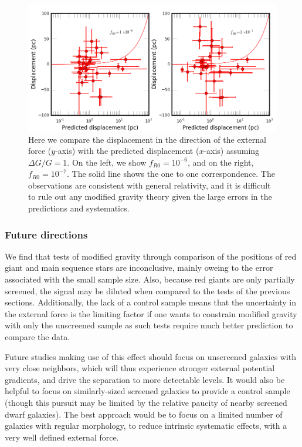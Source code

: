 \documentclass[useAMS,usenatbib,twocolumn]{mn2e}
\begin{document}
\begin{figure}
\includegraphics[scale=0.5]{figures/disppred.png}
  \caption{Here we compare the displacement in the direction of the external
force ($y$-axis) with the predicted displacement ($x$-axis) assuming $\Delta
G/G=1$. On the
left, we show $f_{R0}=10^{-6}$, and on the right, $f_{R0}=10^{-7}$. The solid
line shows the one to one correspondence. The observations are consistent with
general relativity, and it is difficult to rule out any modified gravity theory
given the large errors in the predictions and systematics.}
\label{fig:rgdisppred}
\end{figure}

\subsubsection{Future directions}
We find that tests of modified gravity through
comparison of the positions of red giant and main sequence stars
are inconclusive, mainly oweing to the error associated with the
small sample size.  Also, because red giants are only
partially screened, the signal may be diluted when compared to
the tests of the previous sections.
Additionally, the lack of a control sample means that
the uncertainty in the external force is the limiting factor
if one wants to constrain modified gravity with only the unscreened sample as
such tests require much better prediction to compare the data. 

Future studies making use of this effect should focus on unscreened galaxies
with very close neighbors, which will thus experience stronger external
potential gradients, and drive the separation to more detectable levels.
It would also be helpful to focus on similarly-sized screened galaxies to
provide a control sample (though this pursuit may be limited by the relative
paucity of nearby screened dwarf galaxies).  
The best approach would be to focus on a limited number of galaxies with
regular morphology, to reduce intrinsic systematic effects, with a very well defined
external force.
\end{document}
